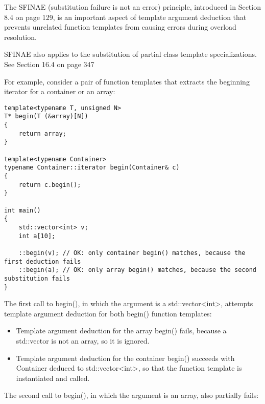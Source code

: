 

The SFINAE (substitution failure is not an error) principle, introduced in Section 8.4 on page 129, is an important aspect of template argument deduction that prevents unrelated function templates from causing errors during overload resolution.

\begin{tcolorbox}[colback=webgreen!5!white,colframe=webgreen!75!black]
\hspace*{0.75cm}SFINAE also applies to the substitution of partial class template specializations. See Section 16.4 on page 347
\end{tcolorbox}

For example, consider a pair of function templates that extracts the beginning iterator for a container or an array:

\begin{lstlisting}[style=styleCXX]
template<typename T, unsigned N>
T* begin(T (&array)[N])
{
	return array;
}

template<typename Container>
typename Container::iterator begin(Container& c)
{
	return c.begin();
}

int main()
{
	std::vector<int> v;
	int a[10];
	
	::begin(v); // OK: only container begin() matches, because the first deduction fails
	::begin(a); // OK: only array begin() matches, because the second substitution fails
}
\end{lstlisting}

The first call to begin(), in which the argument is a std::vector<int>, attempts template argument deduction for both begin() function templates:

\begin{itemize}
\item 
Template argument deduction for the array begin() fails, because a std::vector is not an array, so it is ignored.

\item 
Template argument deduction for the container begin() succeeds with Container deduced to std::vector<int>, so that the function template is instantiated and called.
\end{itemize}

The second call to begin(), in which the argument is an array, also partially fails:

